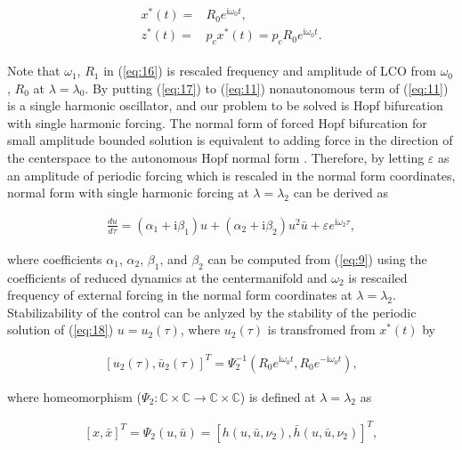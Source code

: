 \documentclass[openacc]{rsproca_new}%
\def\complex{\mathbb{C}}
\def\epsilon{\varepsilon}
\newcommand{\Eref}[1]{(\ref{#1})}
\begin{document}
\begin{align}\label{eq:17}
    \begin{split}
x^*(t)=&R_0e^{\textrm{i}\omega_0 t},\\
z^*(t)=&p_cx^*(t)=p_cR_0e^{\textrm{i}\omega_0 t}.
\end{split}
\end{align}

\noindent Note that $\omega_1$, $R_1$ in \Eref{eq:16} is rescaled frequency and amplitude of LCO from $\omega_0$, $R_0$ at $\lambda=\lambda_0$. By putting \Eref{eq:17} to \Eref{eq:11} nonautonomous term of \Eref{eq:11} is a single harmonic oscillator, and our problem to be solved is Hopf bifurcation with single harmonic forcing. The normal form of forced Hopf bifurcation for small amplitude bounded solution is equivalent to adding force in the direction of the centerspace to the autonomous Hopf normal form \cite{golubitsky2012feed,elphick1987normal}. Therefore, by letting $\epsilon$ as an amplitude of periodic forcing which is rescaled in the normal form coordinates, normal form with single harmonic forcing at $\lambda=\lambda_2$ can be derived as

\begin{align}\label{eq:18}
  \frac{du}{d\tau}=(\alpha_1+\textrm{i}\beta_1)u+(\alpha_2+\textrm{i}\beta_2)u^2\bar u+\epsilon e^{\textrm{i}\omega_2\tau},
\end{align}

\noindent where coefficients $\alpha_1$, $\alpha_2$, $\beta_1$, and $\beta_2$ can be computed from \Eref{eq:9} using the coefficients of reduced dynamics at the centermanifold and $\omega_2$ is rescailed frequency of external forcing in the normal form coordinates at $\lambda=\lambda_2$. Stabilizability of the control can be anlyzed by the stability of the periodic solution of \Eref{eq:18} $u=u_2(\tau)$, where $u_2(\tau)$ is transfromed from $x^*(t)$ by


\begin{align}\label{eq:19}
[u_2(\tau),\bar u_2(\tau)]^T = \Psi_2^{-1}(R_0e^{\textrm{i}\omega_0 t},R_0e^{-\textrm{i}\omega_0 t}),
\end{align}

\noindent where homeomorphism ($\Psi_2:\complex\times\complex\rightarrow\complex\times\complex$) is defined at $\lambda=\lambda_2$ as

\begin{align}\label{eq:hm}
[x,\bar x]^T=\Psi_2(u,\bar u)=[h(u,\bar u,\nu_2),\bar h(u,\bar u,\nu_2)]^T,
\end{align}
\end{document}

